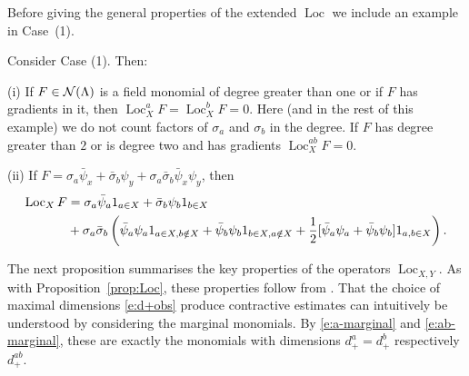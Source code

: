\documentclass[11pt]{amsart}
\numberwithin{equation}{section}
\numberwithin{theorem}{section}
\newcommand{\1}{{\bf 1}}
\newcommand{\Loc}{\operatorname{Loc}}
\begin{document}
Before giving the general properties of the extended $\Loc$ we include an example in Case~(1).
  
\begin{example}
  Consider Case (1). Then:
    
    \smallskip
    \noindent
    (i) If  $F\in \mathcal N(\Lambda)$ is a field monomial of degree greater
    than one or if $F$ has gradients in it,  then $\Loc^a_X F =
    \Loc^b_X F=0$. Here (and in the rest of this example) we do not
    count factors of $\sigma_{a}$ and $\sigma_{b}$ in the degree.
    If $F$ has degree greater than $2$ or is degree two and has gradients $\Loc^{ab}_X F =0$. 

  \smallskip
  \noindent
  (ii) If $F=  \sigma_a \bar\psi_x+ \bar{\sigma}_b \psi_y+  \sigma_a \bar{\sigma}_b  \bar\psi_x\psi_y$, then 
  \begin{align} \label{e:ex-Locobs}
    \Loc_X F &= \sigma_a \bar\psi_a 1_{a\in X}+ \bar{\sigma}_b \psi_b  1_{b\in X}\nnb
    &+  \sigma_a \bar{\sigma}_b  \left(\bar\psi_a\psi_a1_{a \in X, b \notin X} + \bar\psi_b\psi_b 1_{ b\in X, a\notin X} +\frac 12 [ \bar\psi_a\psi_a+ \bar\psi_b\psi_b] 1_{a, b\in X} \right).
  \end{align}
\end{example}

The next proposition summarises the key properties of
the operators $\Loc_{X,Y}$. As with Proposition~\ref{prop:Loc},
these properties follow from \cite{MR3332939}.
%
That the choice of maximal dimensions \eqref{e:d+obs} produce contractive estimates can intuitively be understood by
considering the marginal monomials. By \eqref{e:a-marginal} and \eqref{e:ab-marginal}, these are exactly the monomials
with dimensions $d_+^a=d_+^b$ respectively $d_+^{ab}$.
\end{document}
